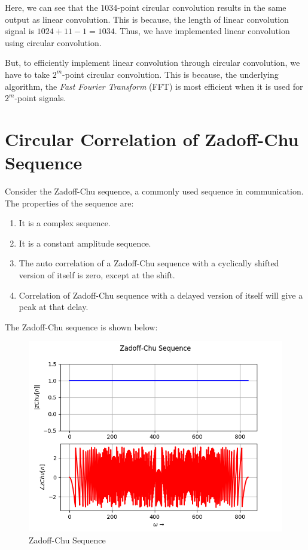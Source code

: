 \documentclass[12pt, a4paper, twoside]{article}
\begin{document}
Here, we can see that the 1034-point circular convolution results in the same output as linear convolution. This is because, the length of linear convolution signal is $1024 + 11 - 1 = 1034$. Thus, we have implemented linear convolution using circular convolution.

But, to efficiently implement linear convolution through circular convolution, we have to take $2^m$-point circular convolution. This is because, the underlying algorithm, the \textit{Fast Fourier Transform} (FFT) is most efficient when it is used for $2^m$-point signals.

\section{Circular Correlation of Zadoff-Chu Sequence}
Consider the Zadoff-Chu sequence, a commonly used sequence in communication. The properties of the sequence are:
\begin{enumerate}
    \item It is a complex sequence.
    \item It is a constant amplitude sequence.
    \item The auto correlation of a Zadoff-Chu sequence with a cyclically shifted version of itself is zero, except at the shift.
    \item Correlation of Zadoff-Chu sequence with a delayed version of itself will give a peak at that delay.
\end{enumerate}

The Zadoff-Chu sequence is shown below:
\begin{figure}[H]
    \centering
    \includegraphics[scale=0.5]{Fig6.png}
    \caption{Zadoff-Chu Sequence}
    \label{fig:Fig6}
\end{figure}
\end{document}
